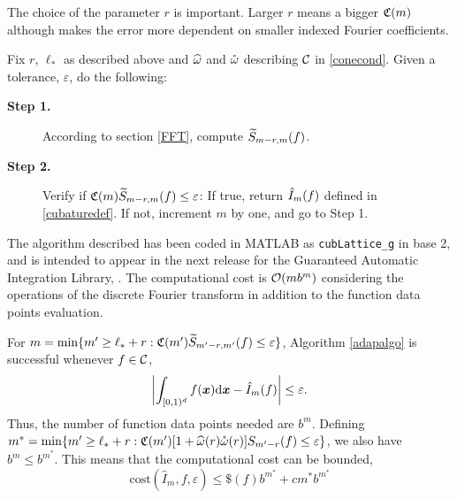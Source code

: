 \documentclass[graybox]{svmult}
\newcommand{\bsx}{\boldsymbol{x}}    %
\begin{document}
The choice of the parameter $r$ is important. Larger $r$ means a bigger $\mathfrak{C}(m)$ although makes the error more dependent on smaller indexed Fourier coefficients.

\begin{algo} \label{adapalgo} Fix $r$, $\ell_*$ as described above and $\widehat{\omega}$ and $\mathring{\omega}$ describing $\mathcal{C}$ in \eqref{conecond}. Given a tolerance, $\varepsilon$, do the following:

\begin{description}
\item[\textbf{Step 1.}] According to section \ref{FFT}, compute $\widetilde{S}_{m-r,m}(f)$.
\item[\textbf{Step 2.}] Verify if $\mathfrak{C}(m)  \widetilde{S}_{m-r,m}(f) \le \varepsilon$: If true, return $\hat{I}_m(f)$ defined in \eqref{cubaturedef}. If not, increment $m$ by one, and go to Step 1.
\end{description}
\end{algo}

The algorithm described has been coded in MATLAB as \texttt{cubLattice\_g} in base 2, and is intended to appear in the next release for the Guaranteed Automatic Integration Library, \cite{ChoEtal14a}.
The computational cost is $\mathcal{O}(m b^m)$ considering the operations of the discrete Fourier transform in addition to the function data points evaluation.

\begin{theorem} \label{adapalgothm} For $m = \min \{m' \ge \ell_*+r : \mathfrak{C}(m')  \widetilde{S}_{m'-r,m'}(f) \le \varepsilon \}$, Algorithm \ref{adapalgo} is successful whenever $f\in\mathcal{C}$,
\[
\biggabs{\int_{\cube} f(\bsx) \D \bsx - \hI_m(f)} \le \varepsilon.
\]
Thus, the number of function data points needed are $b^m$. Defining $m^* = \min \{m' \ge \ell_*+r : \mathfrak{C}(m') [1+ \widehat{\omega}(r) \mathring{\omega}(r)] S_{m'-r}(f) \le \varepsilon \}$, we also have $b^m\leq b^{m^*}$. This means that the computational cost can be bounded,
\[
\mathrm{cost}\left(\widehat{I}_m,f,\varepsilon\right)\leq \$(f)b^{m^*}+cm^*b^{m^*}
\]
\end{theorem}
\end{document}
